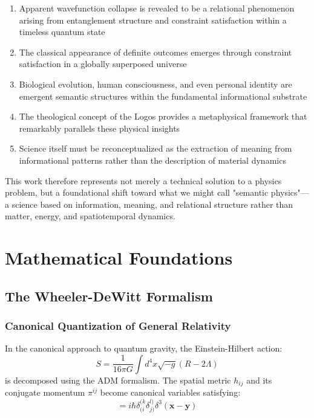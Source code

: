 \documentclass[12pt,a4paper]{article}
\newcommand{\op}[1]{\hat{#1}}
\begin{document}
\begin{enumerate}
    \item Apparent wavefunction collapse is revealed to be a relational phenomenon arising from entanglement structure and constraint satisfaction within a timeless quantum state
    \item The classical appearance of definite outcomes emerges through constraint satisfaction in a globally superposed universe
    \item Biological evolution, human consciousness, and even personal identity are emergent semantic structures within the fundamental informational substrate
    \item The theological concept of the Logos provides a metaphysical framework that remarkably parallels these physical insights
    \item Science itself must be reconceptualized as the extraction of meaning from informational patterns rather than the description of material dynamics
\end{enumerate}

This work therefore represents not merely a technical solution to a physics problem, but a foundational shift toward what we might call "semantic physics"—a science based on information, meaning, and relational structure rather than matter, energy, and spatiotemporal dynamics.

\section{Mathematical Foundations}

\subsection{The Wheeler-DeWitt Formalism}

\subsubsection{Canonical Quantization of General Relativity}

In the canonical approach to quantum gravity, the Einstein-Hilbert action:
\begin{equation}
    S = \frac{1}{16\pi G}\int d^4x \sqrt{-g}(R - 2\Lambda)
\end{equation}
is decomposed using the ADM formalism. The spatial metric $h_{ij}$ and its conjugate momentum $\pi^{ij}$ become canonical variables satisfying:
\begin{equation}
    [\op{h}_{ij}(\mathbf{x}), \op{\pi}^{kl}(\mathbf{y})] = i\hbar \delta^{(k}_{(i}\delta^{l)}_{j)}\delta^3(\mathbf{x}-\mathbf{y})
\end{equation}
\end{document}
